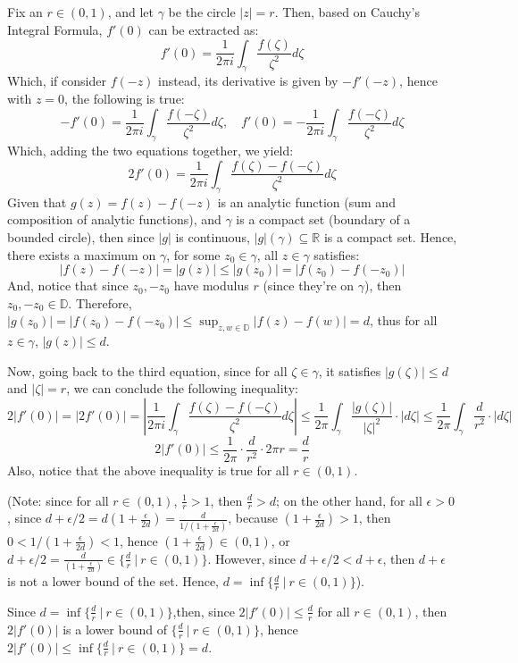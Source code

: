 \documentclass{article}
\begin{document}
Fix an $r\in(0,1)$, and let $\gamma$ be the circle $|z|=r$. Then, based on Cauchy's Integral Formula, $f'(0)$ can be extracted as:
$$f'(0)=\frac{1}{2\pi i}\int_{\gamma}\frac{f(\zeta)}{\zeta^2}d\zeta$$
Which, if consider $f(-z)$ instead, its derivative is given by $-f'(-z)$, hence with $z=0$, the following is true:
$$-f'(0)=\frac{1}{2\pi i}\int_{\gamma}\frac{f(-\zeta)}{\zeta^2}d\zeta,\quad f'(0)=-\frac{1}{2\pi i}\int_{\gamma}\frac{f(-\zeta)}{\zeta^2}d\zeta$$
Which, adding the two equations together, we yield:
$$2f'(0)=\frac{1}{2\pi i}\int_{\gamma}\frac{f(\zeta)-f(-\zeta)}{\zeta^2}d\zeta$$
Given that $g(z)=f(z)-f(-z)$ is an analytic function (sum and composition of analytic functions), and $\gamma$ is a compact set (boundary of a bounded circle),
then since $|g|$ is continuous, $|g|(\gamma)\subseteq \mathbb{R}$ is a compact set. Hence, there exists a maximum on $\gamma$, for some $z_0\in\gamma$, all $z\in\gamma$ satisfies:
$$|f(z)-f(-z)|=|g(z)|\leq |g(z_0)|=|f(z_0)-f(-z_0)|$$
And, notice that since $z_0, -z_0$ have modulus $r$ (since they're on $\gamma$), then $z_0,-z_0\in \mathbb{D}$. Therefore,
$|g(z_0)|=|f(z_0)-f(-z_0)| \leq \sup_{z,w\in\mathbb{D}}|f(z)-f(w)| = d$, thus for all $z\in\gamma$, $|g(z)|\leq d$.

\hfill

Now, going back to the third equation, since for all $\zeta\in\gamma$, it satisfies $|g(\zeta)|\leq d$ and $|\zeta| = r$, we can conclude the following inequality:
$$2|f'(0)| = |2f'(0)| = \left|\frac{1}{2\pi i}\int_{\gamma}\frac{f(\zeta)-f(-\zeta)}{\zeta^2}d\zeta\right|\leq\frac{1}{2\pi}\int_{\gamma}\frac{|g(\zeta)|}{|\zeta|^2}\cdot|d\zeta| \leq \frac{1}{2\pi}\int_{\gamma}\frac{d}{r^2}\cdot |d\zeta|$$
$$2|f'(0)| \leq \frac{1}{2\pi}\cdot \frac{d}{r^2}\cdot 2\pi r = \frac{d}{r}$$
Also, notice that the above inequality is true for all $r\in (0,1)$.

(Note: since for all $r\in (0,1)$, $\frac{1}{r}>1$, then $\frac{d}{r}>d$; on the other hand, for all $\epsilon>0$, since $d+\epsilon/2 = d(1+\frac{\epsilon}{2d}) = \frac{d}{1/(1+\frac{\epsilon}{2d})}$,
because $(1+\frac{\epsilon}{2d})>1$, then $0<1/(1+\frac{\epsilon}{2d})<1$, hence $(1+\frac{\epsilon}{2d})\in (0,1)$, or $d+\epsilon/2=\frac{d}{(1+\frac{\epsilon}{2d})}\in \{\frac{d}{r}\ |\ r\in(0,1)\}$.
However, since $d+\epsilon/2 < d+\epsilon$, then $d+\epsilon$ is not a lower bound of the set. Hence, $d=\inf\{\frac{d}{r}\ |\ r\in(0,1)\}$).

Since $d = \inf\{\frac{d}{r}\ |\ r\in(0,1)\}$,then, since $2|f'(0)| \leq \frac{d}{r}$ for all $r\in(0,1)$, then $2|f'(0)|$ is a lower bound of $\{\frac{d}{r}\ |\ r\in(0,1)\}$,
hence $2|f'(0)| \leq \inf\{\frac{d}{r}\ |\ r\in(0,1)\} = d$.
\end{document}
